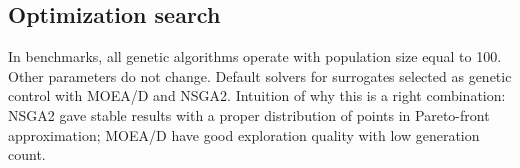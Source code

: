         \begin{table}[]
            \caption{Selected multi-objective test problems\label{bench_problems}}
            \centering
        \end{table}



    \subsection{Optimization search}
    In benchmarks, all genetic algorithms operate with population size equal to 100. Other parameters do not change. 
    Default solvers for surrogates selected as genetic control with MOEA/D and NSGA2. Intuition of why this is a right combination: NSGA2 gave stable results with a proper distribution of points in Pareto-front approximation; MOEA/D have good exploration quality with low generation count.


